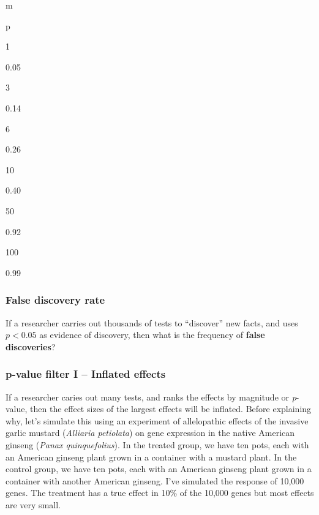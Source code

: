 \documentclass[]{book}
\begin{document}
m

p

1

0.05

3

0.14

6

0.26

10

0.40

50

0.92

100

0.99

\hypertarget{false-discovery-rate}{%
\subsubsection{False discovery rate}\label{false-discovery-rate}}

If a researcher carries out thousands of tests to ``discover'' new facts, and uses \(p < 0.05\) as evidence of discovery, then what is the frequency of \textbf{false discoveries}?

\hypertarget{p-value-filter-i-inflated-effects}{%
\subsubsection{p-value filter I -- Inflated effects}\label{p-value-filter-i-inflated-effects}}

If a researcher caries out many tests, and ranks the effects by magnitude or \emph{p}-value, then the effect sizes of the largest effects will be inflated. Before explaining why, let's simulate this using an experiment of allelopathic effects of the invasive garlic mustard (\emph{Alliaria petiolata}) on gene expression in the native American ginseng (\emph{Panax quinquefolius}). In the treated group, we have ten pots, each with an American ginseng plant grown in a container with a mustard plant. In the control group, we have ten pots, each with an American ginseng plant grown in a container with another American ginseng. I've simulated the response of 10,000 genes. The treatment has a true effect in 10\% of the 10,000 genes but most effects are very small.
\end{document}
